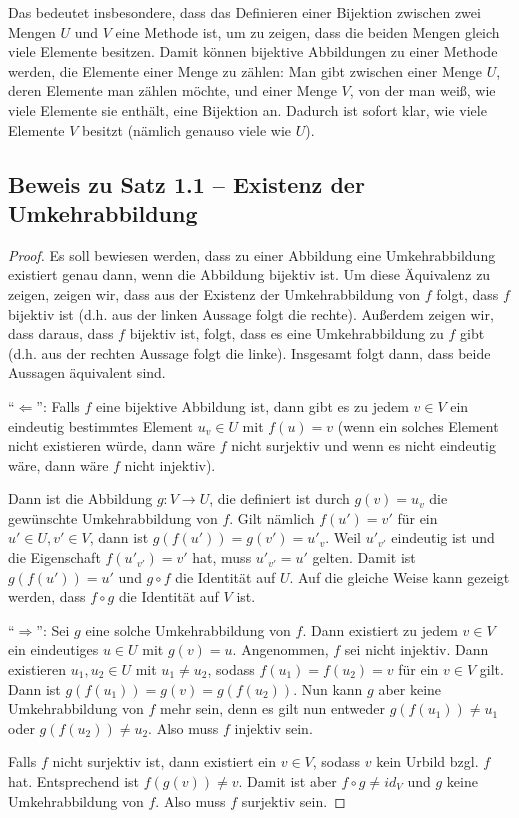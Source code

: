 \documentclass[../../main.tex]{subfiles}
\begin{document}
Das bedeutet insbesondere, dass das Definieren einer Bijektion zwischen zwei Mengen $U$ und $V$ eine Methode ist, um zu zeigen, dass die beiden Mengen gleich viele Elemente besitzen. Damit können bijektive Abbildungen zu einer Methode werden, die Elemente einer Menge zu zählen: Man gibt zwischen einer Menge $U$, deren Elemente man zählen möchte, und einer Menge $V$, von der man weiß, wie viele Elemente sie enthält, eine Bijektion an. Dadurch ist sofort klar, wie viele Elemente $V$ besitzt (nämlich genauso viele wie $U$).

\subsection*{Beweis zu Satz 1.1 -- Existenz der Umkehrabbildung}
\begin{proof}
    \label{proof:existenceOfInverseMap}
    Es soll bewiesen werden, dass zu einer Abbildung eine Umkehrabbildung existiert genau dann, wenn die Abbildung bijektiv ist. Um diese Äquivalenz zu zeigen, zeigen wir, dass aus der Existenz der Umkehrabbildung von $f$ folgt, dass $f$ bijektiv ist (d.h. aus der linken Aussage folgt die rechte). Außerdem zeigen wir, dass daraus, dass $f$ bijektiv ist, folgt, dass es eine Umkehrabbildung zu $f$ gibt (d.h. aus der rechten Aussage folgt die linke). Insgesamt folgt dann, dass beide Aussagen äquivalent sind.
    
    \enquote{$\Leftarrow$}:
    Falls $f$ eine bijektive Abbildung ist, dann gibt es zu jedem $v\in V$ ein eindeutig bestimmtes Element $u_v\in U$ mit $f(u)=v$ (wenn ein solches Element nicht existieren würde, dann wäre $f$ nicht surjektiv und wenn es nicht eindeutig wäre, dann wäre $f$ nicht injektiv). 
    
    Dann ist die Abbildung $g\colon V\rightarrow U$, die definiert ist durch $g(v)=u_v$ die gewünschte Umkehrabbildung von $f$. Gilt nämlich $f(u')=v'$ für ein $u'\in U,v'\in V$, dann ist $g(f(u'))=g(v')=u'_v$. Weil $u'_{v'}$ eindeutig ist und die Eigenschaft $f(u'_{v'})=v'$ hat, muss $u'_{v'}=u'$ gelten. Damit ist $g(f(u'))=u'$ und $g\circ f$ die Identität auf $U$. Auf die gleiche Weise kann gezeigt werden, dass $f\circ g$ die Identität auf $V$ ist.
    
    \enquote{$\Rightarrow$}:
    Sei $g$ eine solche Umkehrabbildung von $f$. Dann existiert zu jedem $v\in V$ ein eindeutiges $u\in U$ mit $g(v)=u$. Angenommen, $f$ sei nicht injektiv. Dann existieren $u_1,u_2\in U$ mit $u_1\neq u_2$, sodass $f(u_1)=f(u_2)=v$ für ein $v\in V$ gilt. Dann ist $g(f(u_1))=g(v)=g(f(u_2))$. Nun kann $g$ aber keine Umkehrabbildung von $f$ mehr sein, denn es gilt nun entweder $g(f(u_1))\neq u_1$ oder $g(f(u_2))\neq u_2$. Also muss $f$ injektiv sein.
    
    Falls $f$ nicht surjektiv ist, dann existiert ein $v\in V$, sodass $v$ kein Urbild bzgl. $f$ hat. Entsprechend ist $f(g(v))\neq v$. Damit ist aber $f\circ g\neq id_V$ und $g$ keine Umkehrabbildung von $f$. Also muss $f$ surjektiv sein.
\end{proof}

\newpage
\pagecolor{white}
\end{document}
